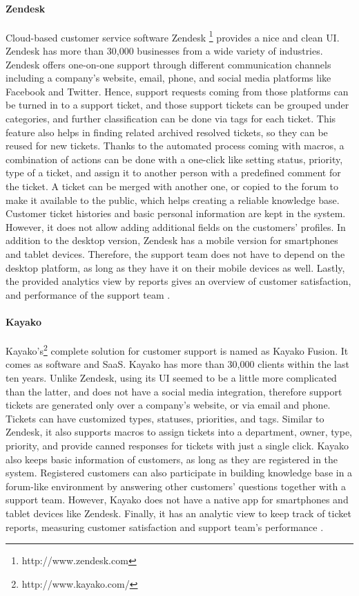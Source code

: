 \paragraph{Zendesk}
Cloud-based customer service software Zendesk \footnote{http://www.zendesk.com} provides a nice and clean \ac{UI}. Zendesk has more than 30,000 businesses from a wide variety of industries. Zendesk offers one-on-one support through different communication channels including a company's website, email, phone, and social media platforms like Facebook and Twitter. Hence, support requests coming from those platforms can be turned in to a support ticket, and those support tickets can be grouped under categories, and further classification can be done via tags for each ticket. This feature also helps in finding related archived resolved tickets, so they can be reused for new tickets. Thanks to the automated process coming with macros, a combination of actions can be done with a one-click like setting status, priority, type of a ticket, and assign it to another person with a predefined comment for the ticket. A ticket can be merged with another one, or copied to the forum to make it available to the public, which helps creating a reliable knowledge base. Customer ticket histories and basic personal information are kept in the system. However, it does not allow adding additional fields on the customers' profiles. In addition to the desktop version, Zendesk has a mobile version for smartphones and tablet devices. Therefore, the support team does not have to depend on the desktop platform, as long as they have it on their mobile devices as well. Lastly, the provided analytics view by reports gives an overview of customer satisfaction, and performance of the support team \citep{Zendesk2013,Zendesk2013a}.

\paragraph{Kayako}
Kayako's\footnote{http://www.kayako.com/} complete solution for customer support is named as Kayako Fusion. It comes as software and \ac{SaaS}. Kayako has more than 30,000 clients within the last ten years. Unlike Zendesk, using its \ac{UI} seemed to be a little more complicated than the latter, and does not have a social media integration, therefore support tickets are generated only over a company's website, or via email and phone. Tickets can have customized types, statuses, priorities, and tags. Similar to Zendesk, it also supports macros to assign tickets into a department, owner, type, priority, and provide canned responses for tickets with just a single click. Kayako also keeps basic information of customers, as long as they are registered in the system. Registered customers can also participate in building knowledge base in a forum-like environment by answering other customers' questions together with a support team. However, Kayako does not have a native app for smartphones and tablet devices like Zendesk. Finally, it has an analytic view to keep track of ticket reports, measuring customer satisfaction and support team's performance \citep{KayakoInc.2013,KayakoInc.2013a}.

